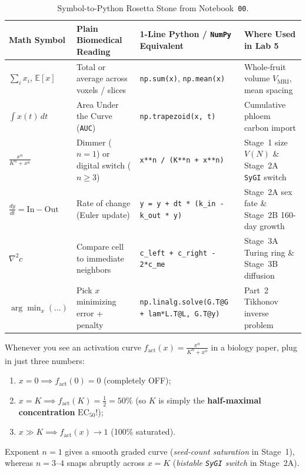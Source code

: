 \documentclass[10.5pt,a4paper]{article}
\begin{document}
\begin{table}[H]
\centering
\scriptsize
\renewcommand{\arraystretch}{1.20}
\begin{tabularx}{\textwidth}{L{2.5cm} L{3.3cm} Y L{3.1cm}}
\toprule
{}
\textbf{Math Symbol} & \textbf{Plain Biomedical Reading} & \textbf{1-Line Python / \texttt{NumPy} Equivalent} & \textbf{Where Used in Lab 5} \\
\midrule
$\sum_i x_i$, $\mathbb{E}[x]$ & Total or average across voxels / slices & \texttt{np.sum(x)}, \texttt{np.mean(x)} & Whole-fruit volume $V_{\text{MRI}}$, mean spacing \\
$\int x(t)\,dt$ & Area Under the Curve (\texttt{AUC}) & \texttt{np.trapezoid(x, t)} & Cumulative phloem carbon import \\
$\frac{x^n}{K^n + x^n}$ & Dimmer ($n=1$) or digital switch ($n\ge 3$) & \texttt{x**n / (K**n + x**n)} & Stage~1 size $V(N)$ \& Stage~2A \texttt{SyGI} switch \\
$\frac{dy}{dt} = \text{In} - \text{Out}$ & Rate of change (Euler update) & \texttt{y = y + dt * (k\_in - k\_out * y)} & Stage~2A sex fate \& Stage~2B 160-day growth \\
$\nabla^2 c$ & Compare cell to immediate neighbors & \texttt{c\_left + c\_right - 2*c\_me} & Stage~3A Turing ring \& Stage~3B diffusion \\
$\arg\min_x (\dots)$ & Pick $x$ minimizing error + penalty & \texttt{np.linalg.solve(G.T@G + lam*L.T@L, G.T@y)} & Part~2 Tikhonov inverse problem \\
\bottomrule
\end{tabularx}
\caption{Symbol-to-Python Rosetta Stone from Notebook~\texttt{00}.}
\label{tab:rosetta}
\end{table}

\begin{infobox}
Whenever you see an activation curve $f_{\text{act}}(x) = \frac{x^n}{K^n + x^n}$ in a biology paper, plug in just three numbers:
\begin{enumerate}
    \item $x = 0 \implies f_{\text{act}}(0) = 0$ (completely OFF);
    \item $x = K \implies f_{\text{act}}(K) = \frac{1}{2} = 50\%$ (so $K$ is simply the \textbf{half-maximal concentration} $\text{EC}_{50}$!);
    \item $x \gg K \implies f_{\text{act}}(x) \to 1$ (100\% saturated).
\end{enumerate}
Exponent $n=1$ gives a smooth graded curve (\emph{seed-count saturation} in Stage~1), whereas $n=3\text{--}4$ snaps abruptly across $x = K$ (\emph{bistable \texttt{SyGI} switch} in Stage~2A).
\end{infobox}
\end{document}
